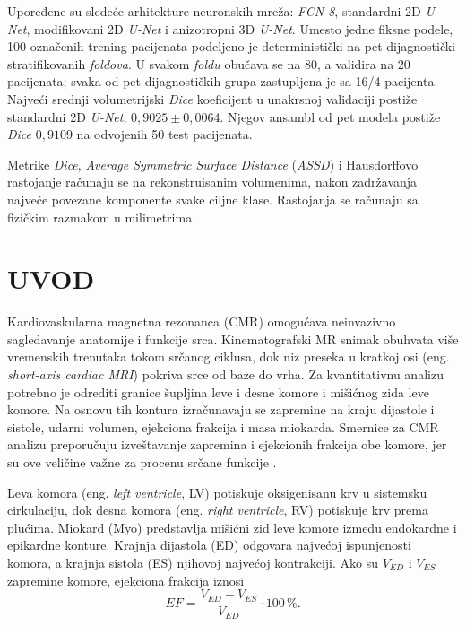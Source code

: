 \documentclass[11pt,a4paper]{article}
\begin{document}
Upoređene su sledeće arhitekture neuronskih mreža: \textit{FCN-8}, standardni 2D \textit{U-Net},
modifikovani 2D \textit{U-Net} i anizotropni 3D \textit{U-Net}. Umesto jedne fiksne podele, 100
označenih trening pacijenata podeljeno je deterministički na pet dijagnostički stratifikovanih
\textit{foldova}. U svakom \textit{foldu} obučava se na 80, a validira na 20 pacijenata; svaka od pet dijagnostičkih
grupa zastupljena je sa 16/4 pacijenta. Najveći srednji volumetrijski \textit{Dice} koeficijent u
unakrsnoj validaciji postiže standardni 2D \textit{U-Net}, $0{,}9025\pm0{,}0064$. Njegov ansambl od
pet modela postiže \textit{Dice} $0{,}9109$ na odvojenih 50 test pacijenata.

Metrike \textit{Dice}, \textit{Average Symmetric Surface Distance} (\textit{ASSD}) i Hausdorffovo
rastojanje računaju se na rekonstruisanim volumenima, nakon zadržavanja najveće povezane komponente
svake ciljne klase. Rastojanja se računaju sa fizičkim razmakom u milimetrima.
\clearpage
\tableofcontents
\clearpage

\section{UVOD}
Kardiovaskularna magnetna rezonanca (CMR) omogućava neinvazivno sagledavanje anatomije i funkcije
srca. Kinematografski MR snimak obuhvata više vremenskih trenutaka tokom srčanog ciklusa, dok niz
preseka u kratkoj osi (eng. \textit{short-axis cardiac MRI}) pokriva srce od baze do vrha. Za
kvantitativnu analizu potrebno je odrediti granice šupljina leve i desne komore i mišićnog zida
leve komore. Na osnovu tih kontura izračunavaju se zapremine na kraju dijastole i sistole, udarni
volumen, ejekciona frakcija i masa miokarda. Smernice za CMR analizu preporučuju izveštavanje
zapremina i ejekcionih frakcija obe komore, jer su ove veličine važne za procenu srčane funkcije
\cite{scmr2022}.

Leva komora (eng. \textit{left ventricle}, LV) potiskuje oksigenisanu krv u sistemsku cirkulaciju,
dok desna komora (eng. \textit{right ventricle}, RV) potiskuje krv prema plućima. Miokard (Myo)
predstavlja mišićni zid leve komore između endokardne i epikardne konture. Krajnja dijastola (ED)
odgovara najvećoj ispunjenosti komora, a krajnja sistola (ES) njihovoj najvećoj kontrakciji. Ako su
$V_{ED}$ i $V_{ES}$ zapremine komore, ejekciona frakcija iznosi
\begin{equation}
	EF=\frac{V_{ED}-V_{ES}}{V_{ED}}\cdot100\,\%.
\end{equation}
\end{document}
